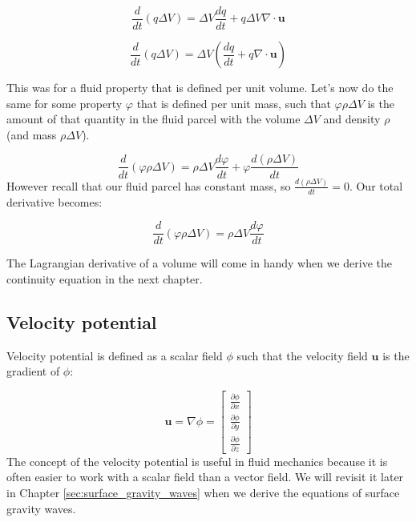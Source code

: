 \documentclass[12pt]{article}
\numberwithin{equation}{section}
\numberwithin{figure}{section}
\numberwithin{table}{section}
\begin{document}
\begin{equation}
  \frac{d}{dt} (q \Delta V) = \Delta V \frac{dq}{dt} + q \Delta V \nabla \cdot \mathbf{u}
\end{equation}

\begin{equation}
  \frac{d}{dt} (q \Delta V) = \Delta V \left( \frac{dq}{dt} + q \nabla \cdot \mathbf{u} \right)
  \label{eq:lagrangian_property_derivative}
\end{equation}

This was for a fluid property that is defined per unit volume.
Let's now do the same for some property $\varphi$ that is defined per unit mass,
such that $\varphi \rho \Delta V$ is the amount of that quantity in the fluid
parcel with the volume $\Delta V$ and density $\rho$ (and mass $\rho \Delta V$).

\begin{equation}
  \frac{d}{dt} (\varphi \rho \Delta V) = \rho \Delta V \frac{d\varphi}{dt} + \varphi \frac{d(\rho \Delta V)}{dt}
\end{equation}
However recall that our fluid parcel has constant mass, so $\frac{d(\rho \Delta V)}{dt} = 0$.
Our total derivative becomes:

\begin{equation}
  \frac{d}{dt} (\varphi \rho \Delta V) = \rho \Delta V \frac{d\varphi}{dt}
\end{equation}

The Lagrangian derivative of a volume will come in handy when we derive the
continuity equation in the next chapter.

\subsection{Velocity potential}

Velocity potential is defined as a scalar field $\phi$ such that the velocity
field $\mathbf{u}$ is the gradient of $\phi$:

\begin{equation}
  \mathbf{u} = \nabla \phi =
  \begin{bmatrix}
    \frac{\partial \phi}{\partial x} \\
    \frac{\partial \phi}{\partial y} \\
    \frac{\partial \phi}{\partial z}
  \end{bmatrix}
\end{equation}
The concept of the velocity potential is useful in fluid mechanics because it is
often easier to work with a scalar field than a vector field.
We will revisit it later in Chapter \ref{sec:surface_gravity_waves} when we
derive the equations of surface gravity waves.
\end{document}
